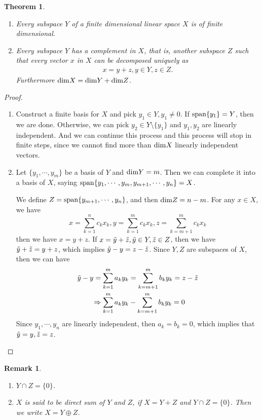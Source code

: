 \documentclass[11pt]{book}
\newtheorem{theorem}{Theorem}[section]
\newtheorem{remark}{Remark}[section]
\theoremstyle{definition}
\numberwithin{equation}{subsection}
\begin{document}
\medskip

\begin{theorem}
~\begin{enumerate}[label=(\alph*)]
    \item Every subspace $Y$ of a finite dimensional linear space $X$ is of finite dimensional.
    \item Every subspace $Y$ has a complement in $X$, that is, another subspace $Z$ such that every vector $x$ in $X$ can be decomposed uniquely as
    \begin{align*}
        x = y + z, y\in Y, z\in Z.
    \end{align*}
    Furthermore ${\rm dim}X = {\rm dim}Y + {\rm dim}Z$.
\end{enumerate}
\end{theorem}
\begin{proof}
~\begin{enumerate}[label=(\alph*)]
    \item Construct a finite basis for $X$ and pick $y_1\in Y, y_1\neq 0$. If ${\rm span}\{y_1\} = Y$, then we are done. Otherwise, we can pick $y_2\in Y\setminus\{y_1\}$ and $y_1, y_2$ are linearly independent. And we can continue this process and this process will stop in finite steps, since we cannot find more than ${\rm dim}X$ linearly independent vectors. 
    \item Let $\{y_1, \cdots, y_m\}$ be a basis of $Y$ and ${\rm dim}Y = m$. Then we can complete it into a basis of $X$, saying ${\rm span}\{y_1, \cdots, y_m, y_{m+1},\cdots, y_n\} = X$. 
    
    We define $Z = {\rm span}\{y_{m+1},\cdots, y_n\}$, and then ${\rm dim}Z = n - m$. For any $x\in X$, we have 
    $$x = \sum^n_{k=1}c_k x_k, y = \sum^m_{k=1}c_k x_k, z = \sum^m_{k=m+1}c_k x_k$$ 
    then we have $x = y+z$. If $x = \Tilde{y} + \Tilde{z}, \Tilde{y}\in Y, \Tilde{z}\in Z$, then we have $\Tilde{y} + \Tilde{z} = y + z$, which implies $\Tilde{y} - y = z - \Tilde{z}$. Since $Y,Z$ are subspaces of $X$, then we can have 
    \begin{align*}
        \Tilde{y} - y = \sum^m_{k=1}a_ky_k & = \sum^m_{k=m+1}b_ky_k = z - \Tilde{z} \\
        \Rightarrow \sum^m_{k=1}a_ky_k & - \sum^m_{k=m+1}b_ky_k = 0
    \end{align*}
    Since $y_1,\cdots, y_n$ are linearly independent, then $a_k = b_k = 0$, which implies that $\Tilde{y}=y, \Tilde{z}=z$.
\end{enumerate}
\end{proof}
\begin{remark}
~\begin{enumerate}[label=(\alph*)]
    \item $Y\cap Z = \{0\}$.
    \item $X$ is said to be direct sum of $Y$ and $Z$, if $X = Y+Z$ and $Y\cap Z = \{0\}$. Then we write $X = Y \oplus Z$.
\end{enumerate}
\end{remark}
\end{document}
